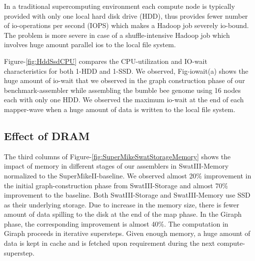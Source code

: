 \documentclass[conference]{IEEEtran}
\begin{document}
In a traditional supercomputing environment each compute node is typically provided with only one local hard disk drive (HDD), thus provides fewer number of io-operations per second (IOPS) which makes a Hadoop job severely io-bound.
The problem is more severe in case of a shuffle-intensive Hadoop job which involves huge amount parallel ios to the local file system.

Figure-\ref{fig:HddSsdCPU} compares the CPU-utilization and IO-wait characteristics for both 1-HDD and 1-SSD.
We observed, Fig-iowait(a) shows the huge amount of io-wait that we observed in the graph construction phase of our benchmark-assembler while assembling the bumble bee genome using 16 nodes each with only one HDD.
We observed the maximum io-wait at the end of each mapper-wave when a huge amount of data is written to the local file system. 

\subsection {Effect of DRAM} \label{EffectOfDRAM}
The third columns of Figure-\ref{fig:SuperMikeSwatStorageMemory} shows the impact of memory in different stages of our assemblers in SwatIII-Memory normalized to the SuperMikeII-baseline. 
We observed almost 20\% improvement in the initial graph-construction phase from SwatIII-Storage and almost 70\% improvement to the baseline. Both SwatIII-Storage and SwatIII-Memory use SSD as their underlying storage. Due to increase in the memory size, there is fewer amount of data spilling to the disk at the end of the map phase.
In the Giraph phase, the corresponding improvement is almost 40\%. The computation in Giraph proceeds in iterative supersteps. Given enough memory, a huge amount of data is kept in cache and is fetched upon requirement during the next compute-superstep.
\end{document}
